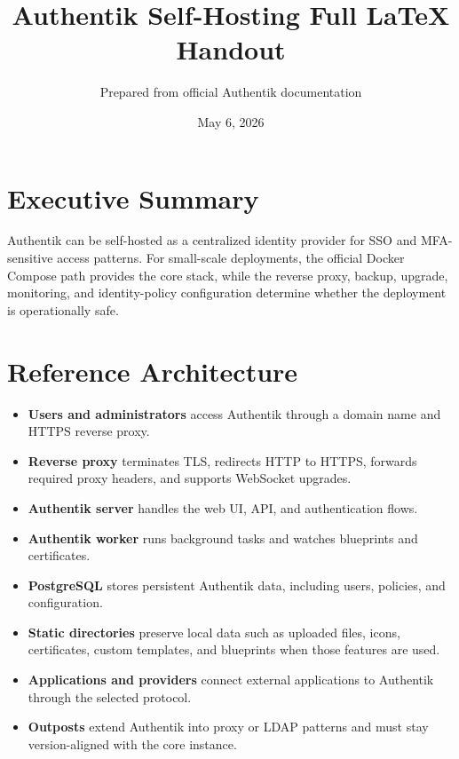 \documentclass[11pt]{article}
\title{Authentik Self-Hosting Full LaTeX Handout}\author{Prepared from official Authentik documentation}\date{May 6, 2026}
\begin{document}
\maketitle

\section*{Executive Summary}
Authentik can be self-hosted as a centralized identity provider for SSO and MFA-sensitive access patterns. For small-scale deployments, the official Docker Compose path provides the core stack, while the reverse proxy, backup, upgrade, monitoring, and identity-policy configuration determine whether the deployment is operationally safe.

\section*{Reference Architecture}
\begin{itemize}
\item \textbf{Users and administrators} access Authentik through a domain name and HTTPS reverse proxy.
\item \textbf{Reverse proxy} terminates TLS, redirects HTTP to HTTPS, forwards required proxy headers, and supports WebSocket upgrades.
\item \textbf{Authentik server} handles the web UI, API, and authentication flows.
\item \textbf{Authentik worker} runs background tasks and watches blueprints and certificates.
\item \textbf{PostgreSQL} stores persistent Authentik data, including users, policies, and configuration.
\item \textbf{Static directories} preserve local data such as uploaded files, icons, certificates, custom templates, and blueprints when those features are used.
\item \textbf{Applications and providers} connect external applications to Authentik through the selected protocol.
\item \textbf{Outposts} extend Authentik into proxy or LDAP patterns and must stay version-aligned with the core instance.
\end{itemize}
\end{document}
